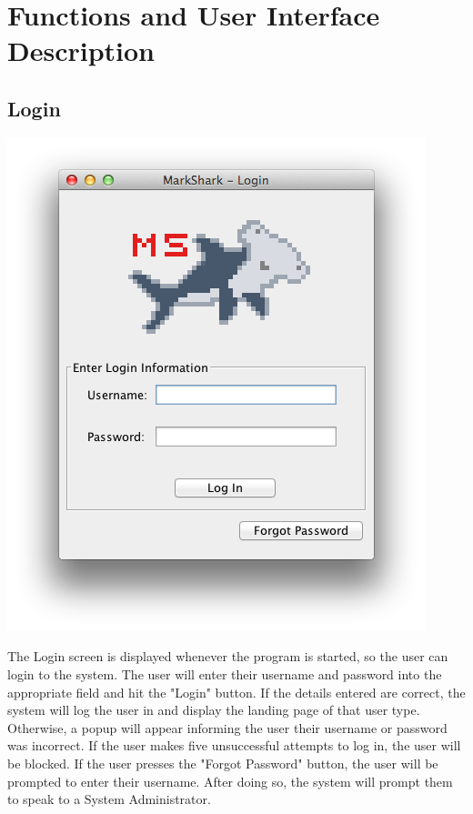 \documentclass{article}
\begin{document}
\clearpage
\section{Functions and User Interface Description}  %
\subsection{Login}
\label{login}
\centerline{\includegraphics[scale=0.65]{../images/UpdatedUIScreens/Login.png}}
The Login screen is displayed whenever the program is started, so the user can login
to the system. The user will enter their username and password into the
appropriate field and hit the "Login" button. If the details entered are correct,
the system will log the user in and display the landing page of that user type. Otherwise, a popup will appear informing the user their username or password was incorrect. If the user makes five unsuccessful attempts to log in, the user will be blocked. If the user presses the "Forgot Password" button, the user will be prompted to enter their username. After doing so, the system will prompt them to speak to a System Administrator. 
\clearpage
\end{document}
